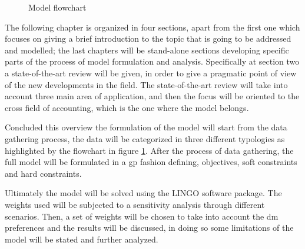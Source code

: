 \begin{doublespace}
\begin{figure}
\centering
{}
\caption{Model flowchart}
\label{fig:flowchart}
\end{figure}

The following chapter is organized in four sections, apart from the first one which focuses on giving a brief introduction to the topic that is going to be addressed and modelled; the last chapters will be stand-alone sections developing specific parts of the process of model formulation and analysis. Specifically at section two a state-of-the-art review will be given, in order to give a pragmatic point of view of the new developments in the field. The state-of-the-art review will take into account three main area of application, and then the focus will be oriented to the cross field of accounting, which is the one where the model belongs. 

Concluded this overview the formulation of the model will start from the data gathering process, the data will be categorized in three different typologies as highlighted by the flowchart in figure \ref{fig:flowchart}. After the process of data gathering, the full model will be formulated in a \gls{gp} fashion defining, objectives, soft constraints and hard constraints.

Ultimately the model will be solved using the LINGO software package. The weights used will be subjected to a sensitivity analysis through different scenarios. Then, a set of weights will be chosen to take into account the \gls{dm} preferences and the results will be discussed, in doing so some limitations of the model will be stated and further analyzed.


\end{doublespace}
